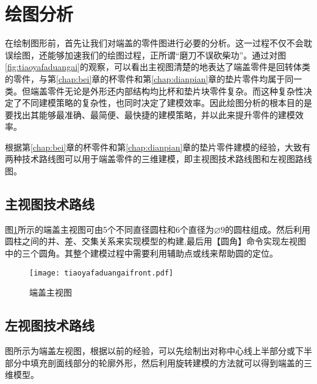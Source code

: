 \section{绘图分析}
在绘制图形前，首先让我们对端盖的零件图进行必要的分析。这一过程不仅不会耽误绘图，还能够加速我们的绘图过程，正所谓“磨刀不误砍柴功”。通过对图\ref{fig:tiaoyafaduangai}的观察，可以看出主视图清楚的地表达了端盖零件是回转体类的零件，与第\ref{chap:bei}章的杯零件和第\ref{chap:dianpian}章的垫片零件均属于同一类。但端盖零件无论是外形还内部结构均比杯和垫片块零件复杂。而这种复杂性决定了不同建模策略的复杂性，也同时决定了建模效率。因此绘图分析的根本目的是要找出其能够最准确、最简便、最快捷的建模策略，并以此来提升零件的建模效率。

根据第\ref{chap:bei}章的杯零件和第\ref{chap:dianpian}章的垫片零件建模的经验，大致有两种技术路线图可以用于端盖零件的三维建模，即主视图技术路线图和左视图路线图。

\subsection{主视图技术路线}
图\ref{fig:tiaoyafaduangaifront}所示的端盖主视图可由5个不同直径圆柱和6个直径为$\diameter 9$的圆柱组成。然后利用圆柱之间的并、差、交集关系来实现模型的构建,最后用【圆角】命令实现左视图中的三个圆角。其整个建模过程中需要利用辅助点或线来帮助圆的定位。
\begin{figure}[htbp]
\centering
\texttt{[image: tiaoyafaduangaifront.pdf]}
\caption{端盖主视图}\label{fig:tiaoyafaduangaifront}
\end{figure}
\subsection{左视图技术路线}
图所示为端盖左视图，根据以前的经验，可以先绘制出对称中心线上半部分或下半部分中填充剖面线部分的轮廓外形，然后利用旋转建模的方法就可以得到端盖的三维模型。
\endinput